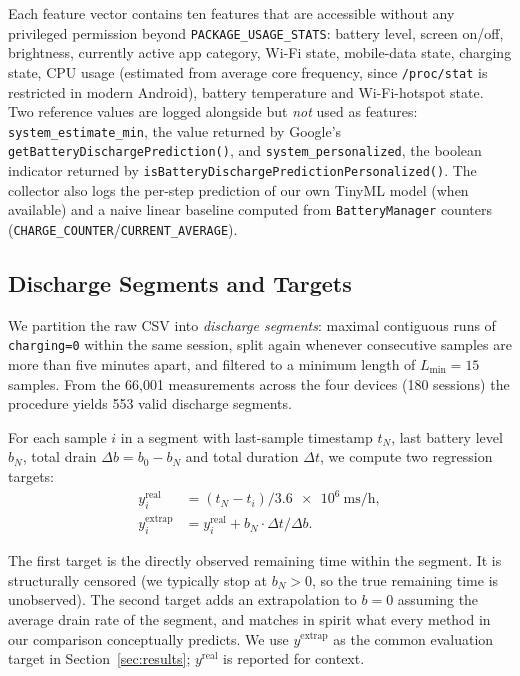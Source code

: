\documentclass[conference]{IEEEtran}
\begin{document}
Each feature vector contains ten features that are accessible without
any privileged permission beyond \texttt{PACKAGE\_USAGE\_STATS}: battery
level, screen on/off, brightness, currently active app category,
Wi-Fi state, mobile-data state, charging state, CPU usage (estimated
from average core frequency, since \texttt{/proc/stat} is restricted in
modern Android), battery temperature and Wi-Fi-hotspot state. Two
reference values are logged alongside but \emph{not} used as features:
\texttt{system\_estimate\_min}, the value returned by Google's
\texttt{getBatteryDischargePrediction()}, and
\texttt{system\_personalized}, the boolean indicator returned by
\texttt{isBatteryDischargePredictionPersonalized()}. The collector also
logs the per-step prediction of our own TinyML model (when available) and
a naive linear baseline computed from \texttt{BatteryManager} counters
(\texttt{CHARGE\_COUNTER}/\texttt{CURRENT\_AVERAGE}).

\subsection{Discharge Segments and Targets}
\label{sec:targets}
We partition the raw CSV into \emph{discharge segments}: maximal
contiguous runs of \texttt{charging=0} within the same session, split
again whenever consecutive samples are more than five minutes apart, and
filtered to a minimum length of $L_{\min}{=}15$ samples. From the
66{,}001 measurements across the four devices (180 sessions) the
procedure yields 553 valid discharge segments.

For each sample $i$ in a segment with last-sample timestamp $t_N$, last
battery level $b_N$, total drain $\Delta b = b_0 - b_N$ and total duration
$\Delta t$, we compute two regression targets:
\begin{align}
y^{\text{real}}_i  &= (t_N - t_i)/{\SI{3.6e6}{} \text{ms/h}}, \label{eq:yreal}\\
y^{\text{extrap}}_i &= y^{\text{real}}_i + b_N \cdot \Delta t / \Delta b. \label{eq:yextrap}
\end{align}

The first target is the directly observed remaining time within the
segment. It is structurally censored (we typically stop at $b_N>0$, so the
true remaining time is unobserved). The second target adds an extrapolation
to $b=0$ assuming the average drain rate of the segment, and matches in
spirit what every method in our comparison conceptually predicts. We use
$y^{\text{extrap}}$ as the common evaluation target in
Section~\ref{sec:results}; $y^{\text{real}}$ is reported for context.
\end{document}
